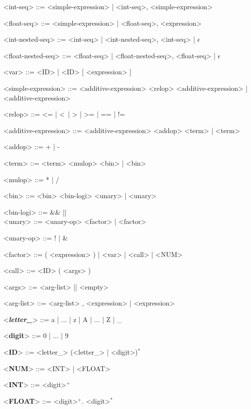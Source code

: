 \begin{grammar}
	<int-seq> ::= <simple-expression> | <int-seq>, <simple-expression>
	
	<float-seq> ::= <simple-expression> | <float-seq>, <expression>
	
	<int-nested-seq> ::= <int-seq> | <int-nested-seq>, <int-seq> | $\epsilon$
	
	<float-nested-seq> ::= <float-seq> | <float-nested-seq>, <float-seq> | $\epsilon$
	
	<var> ::= <ID> | <ID> [ <expression> ]
	
	<simple-expression> ::= <additive-expression> <relop> <additive-expression> | <additive-expression>
	
	<relop> ::= \textless= | \textless\ | > | >= | == | !=
	
	<additive-expression> ::= <additive-expression> <addop> <term> | <term>
	
	<addop> ::= + | - 
	
	<term> ::= <term> <mulop> <bin> | <bin>
	
	<mulop> ::= * | / 
	
	<bin> ::= <bin> <bin-logi> <unary> | <unary>
	
	<bin-logi> ::= \&\& \alt || \alt \^ \\
	
	<unary> ::= <unary-op> <factor> | <factor> 
	
	<unary-op> ::= ! | \&
	
	<factor> ::= ( <expression> ) | <var> | <call> | <NUM>
	
	<call> ::= <ID> ( <args> ) 
	
	<args> ::= <arg-list> || <empty> 
	
	<arg-list> ::= <arg-list> , <expression> | <expression>
	
	<\textbf{\textit{letter\_}}> ::= a | ... | z | A | ... | Z | \_
	
	<\textbf{digit}> ::= 0 | ... | 9
	
	<\textbf{ID}> ::= <letter\_> (<letter\_> | <digit>)$^*$
	
	<\textbf{NUM}> ::= <INT> | <FLOAT>
	
	<\textbf{INT}> ::= <digit>$^+$
	
	<\textbf{FLOAT}> ::= <digit>$^+$.  <digit>$^*$
	
\end{grammar}
